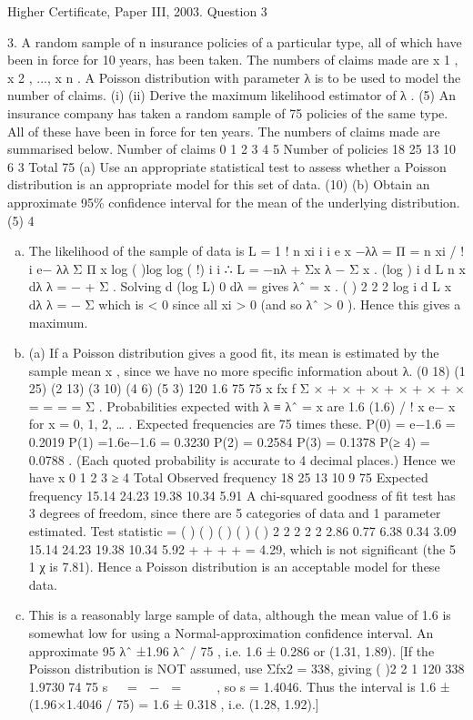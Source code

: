 \documentclass[a4paper,12pt]{article}
\begin{document}
Higher Certificate, Paper III, 2003. Question 3

\begin{framed}
3.
A random sample of n insurance policies of a particular type, all of which have been in
force for 10 years, has been taken. The numbers of claims made are x 1 , x 2 , ..., x n . A
Poisson distribution with parameter λ is to be used to model the number of claims.
(i)
(ii)
Derive the maximum likelihood estimator of λ .
(5)
An insurance company has taken a random sample of 75 policies of the same
type. All of these have been in force for ten years. The numbers of claims
made are summarised below.
Number of claims
0
1
2
3
4
5
Number of policies
18
25
13
10
6
3
Total 75
(a) Use an appropriate statistical test to assess whether a Poisson
distribution is an appropriate model for this set of data.
(10)
(b) Obtain an approximate 95\% confidence interval for the mean of the
underlying distribution.
(5)
4
\end{framed}
\begin{enumerate}[(a)]
\item  The likelihood of the sample of data is L =
1 !
n xi
i i
e
x
−λλ
= Π
= n xi / !
i e− λλ Σ Π x
log ( )log log ( !) i i ∴ L = −nλ + Σx λ − Σ x .
(log ) i d L n x
dλ λ
= − + Σ . Solving d (log L) 0
dλ
= gives λˆ = x .
( )
2
2 2 log i d L x
dλ λ
= − Σ which is < 0 since all xi > 0 (and so λˆ > 0 ). Hence this
gives a maximum.
\item (a) If a Poisson distribution gives a good fit, its mean is estimated by the
sample mean x , since we have no more specific information about λ.
(0 18) (1 25) (2 13) (3 10) (4 6) (5 3) 120 1.6
75 75
x fx
f
Σ × + × + × + × + × + × = = = =
Σ
.
Probabilities expected with λ ≡ λˆ = x are 1.6 (1.6) / ! x e− x for x = 0, 1, 2, … .
Expected frequencies are 75 times these.
P(0) = e−1.6 = 0.2019 P(1) =1.6e−1.6 = 0.3230 P(2) = 0.2584
P(3) = 0.1378 P(≥ 4) = 0.0788 .
(Each quoted probability is accurate to 4 decimal places.)
Hence we have
x 0 1 2 3 ≥ 4 Total
Observed frequency 18 25 13 10 9 75
Expected frequency 15.14 24.23 19.38 10.34 5.91
A chi-squared goodness of fit test has 3 degrees of freedom, since there are 5
categories of data and 1 parameter estimated.
Test statistic = ( ) ( ) ( ) ( ) ( ) 2 2 2 2 2 2.86 0.77 6.38 0.34 3.09
15.14 24.23 19.38 10.34 5.92
+ + + + = 4.29, which
is not significant (the 5%
1 χ is 7.81). Hence a Poisson distribution is
an acceptable model for these data.
\item This is a reasonably large sample of data, although the mean value of
1.6 is somewhat low for using a Normal-approximation confidence interval.
An approximate 95%
λˆ ±1.96 λˆ / 75 , i.e. 1.6 ± 0.286 or (1.31, 1.89).
[If the Poisson distribution is NOT assumed, use Σfx2 = 338, giving
( )2
2 1 120 338 1.9730
74 75
s
 
=  −  =
 
 
, so s = 1.4046. Thus the interval is
1.6 ± (1.96×1.4046 / 75) = 1.6 ± 0.318 , i.e. (1.28, 1.92).]
\end{enumerate}
\end{document}
